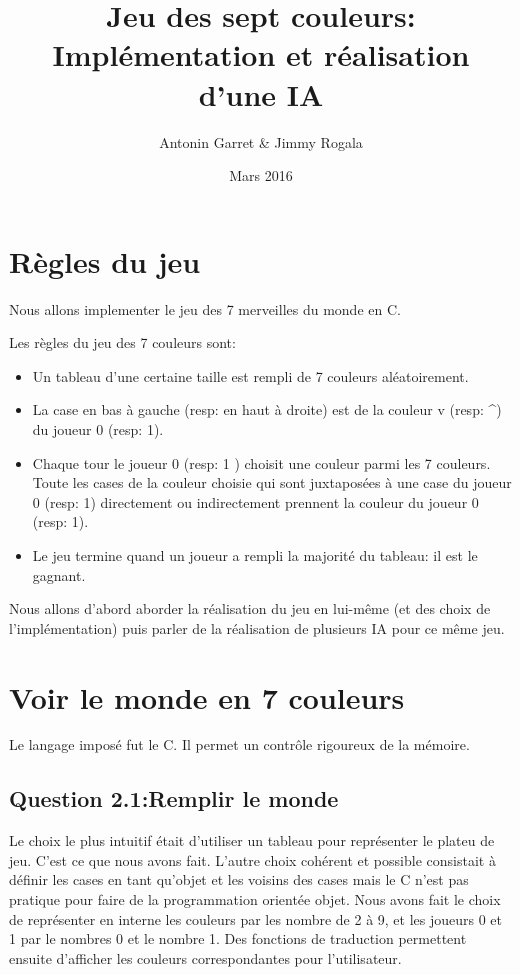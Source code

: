 \documentclass{article}
\title{Jeu des sept couleurs: Implémentation et réalisation d'une IA}
\author{Antonin Garret & Jimmy Rogala}
\date{Mars 2016}
\begin{document}
\maketitle
\tableofcontents
\clearpage
\section{Règles du jeu}
Nous allons implementer le jeu des 7 merveilles du monde en C.

    Les règles du jeu des 7 couleurs sont:
    \begin{itemize} %
      \item Un tableau d'une certaine taille est rempli de 7 couleurs aléatoirement.
      \item La case en bas à gauche (resp: en haut à droite) est de la couleur v (resp: \textasciicircum ) du joueur 0 (resp: 1).
      \item Chaque tour le joueur 0 (resp: 1 ) choisit une couleur parmi les 7 couleurs. Toute les cases de la couleur choisie qui sont juxtaposées à une case du joueur 0 (resp: 1) directement ou indirectement prennent la couleur du joueur 0 (resp: 1).
      \item Le jeu termine quand un joueur a rempli la majorité du tableau: il est le gagnant.
    \end{itemize}

    Nous allons d'abord aborder la réalisation du jeu en lui-même (et des choix de l'implémentation) puis parler de la réalisation de plusieurs IA pour ce même jeu.


\section{Voir le monde en 7 couleurs}
    Le langage imposé fut le C. Il permet un contrôle rigoureux de la mémoire.

    \subsection*{Question 2.1:Remplir le monde}

      Le choix le plus intuitif était d'utiliser un tableau pour représenter le plateu de jeu. C'est ce que nous avons fait. L'autre choix cohérent et possible consistait à définir les cases en tant qu'objet et les voisins des cases mais le C n'est pas pratique pour faire de la programmation orientée objet.
      Nous avons fait le choix de représenter en interne les couleurs par les nombre de 2 à 9, et les joueurs 0 et 1 par le nombres 0 et le nombre 1. Des fonctions de traduction permettent ensuite d'afficher les couleurs correspondantes pour l'utilisateur.
\end{document}
